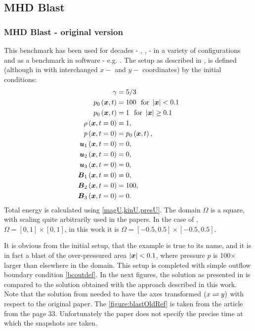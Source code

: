 \subsection{MHD Blast}
\subsubsection{MHD Blast - original version}
This benchmark has been used for decades - \cite{blast0}, \cite{blast1}, \cite{blast2} - in a variety of configurations and as a benchmark in software - e.g. \citep{athena}. The setup as described in \cite{blast0}, \cite{blast1} is defined (although in \cite{blast1} with interchanged $x-$ and $y-$ coordinates) by the initial conditions:
\begin{align}
\label{mhdBlastOld}
\gamma & =  5 / 3\\ \nonumber
p_0\left(\mbox{\boldmath $x$}, t\right) & =  100\ \ \text{for}\ \left|\mbox{\boldmath $x$}\right| < 0.1\\ \nonumber
p_0\left(\mbox{\boldmath $x$}, t\right) & =  1\ \ \text{for}\ \left|\mbox{\boldmath $x$}\right| \geq 0.1\\ \nonumber
\rho\left(\mbox{\boldmath $x$}, t = 0\right) & =  1,\\ \nonumber
p\left(\mbox{\boldmath $x$}, t = 0\right) & =  p_0\left(\mbox{\boldmath $x$}, t\right),\\ \nonumber
\mbox{\boldmath $u$}_1\left(\mbox{\boldmath $x$}, t = 0\right) & =  0,\\ \nonumber
\mbox{\boldmath $u$}_2\left(\mbox{\boldmath $x$}, t = 0\right) & =  0,\\ \nonumber
\mbox{\boldmath $u$}_3\left(\mbox{\boldmath $x$}, t = 0\right) & =  0,\\ \nonumber
\mbox{\boldmath $B$}_1\left(\mbox{\boldmath $x$}, t = 0\right) & =  0,\\ \nonumber
\mbox{\boldmath $B$}_2\left(\mbox{\boldmath $x$}, t = 0\right) & =  100,\\ \nonumber
\mbox{\boldmath $B$}_3\left(\mbox{\boldmath $x$}, t = 0\right) & =  0.
\end{align}
Total energy is calculated using \cref{magU,kinU,presU}.
The domain $\Omega$ is a square, with scaling quite arbitrarily used in the papers. In the case of \cite{blast1}, $\Omega = [0, 1] \times [0, 1]$, in this work it is $\Omega = [-0.5, 0.5] \times [-0.5, 0.5]$.

It is obvious from the initial setup, that the example is true to its name, and it is in fact a blast of the over-pressured area $\left|\mbox{\boldmath $x$}\right| < 0.1$, where pressure $p$ is 100$\times$ larger than elsewhere in the domain. This setup is completed with simple outflow boundary condition \cref{bcoutdef}.
In the next figures, the solution as presented in \cite{blast1} is compared to the solution obtained with the approach described in this work. Note that the solution from \cite{blast1} needed to have the axes transformed $\left( x\rightleftharpoons y\right)$ with respect to the original paper. The \cref{figure:blastOldRef} is taken from the article \cite{blast1} from the page 33. Unfortunately the paper does not specify the precise time at which the snapshots are taken.

